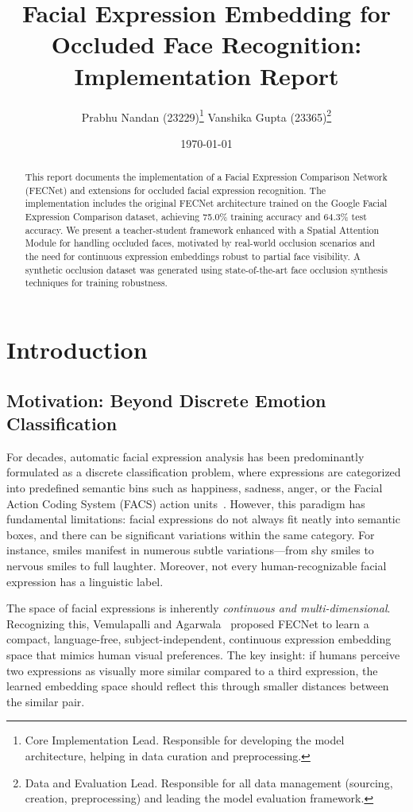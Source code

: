 \documentclass[10pt,twocolumn]{article}
\title{\textbf{Facial Expression Embedding for Occluded Face Recognition: \\ Implementation Report}}
\author{
    Prabhu Nandan (23229)\thanks{Core Implementation Lead. Responsible for developing the model architecture, helping in data curation and preprocessing.} \quad
    Vanshika Gupta (23365)\thanks{Data and Evaluation Lead. Responsible for all data management (sourcing, creation, preprocessing) and leading the model evaluation framework.}
}
\date{\today}
\begin{document}
\maketitle

\begin{abstract}
This report documents the implementation of a Facial Expression Comparison Network (FECNet) and extensions for occluded facial expression recognition. The implementation includes the original FECNet architecture trained on the Google Facial Expression Comparison dataset, achieving 75.0\% training accuracy and 64.3\% test accuracy. We present a teacher-student framework enhanced with a Spatial Attention Module for handling occluded faces, motivated by real-world occlusion scenarios and the need for continuous expression embeddings robust to partial face visibility. A synthetic occlusion dataset was generated using state-of-the-art face occlusion synthesis techniques for training robustness.
\end{abstract}

\section{Introduction}

\subsection{Motivation: Beyond Discrete Emotion Classification}
For decades, automatic facial expression analysis has been predominantly formulated as a discrete classification problem, where expressions are categorized into predefined semantic bins such as happiness, sadness, anger, or the Facial Action Coding System (FACS) action units~\cite{ekman1978facial}. However, this paradigm has fundamental limitations: facial expressions do not always fit neatly into semantic boxes, and there can be significant variations within the same category. For instance, smiles manifest in numerous subtle variations—from shy smiles to nervous smiles to full laughter. Moreover, not every human-recognizable facial expression has a linguistic label.

The space of facial expressions is inherently \textit{continuous and multi-dimensional}. Recognizing this, Vemulapalli and Agarwala~\cite{vemulapalli2019compact} proposed FECNet to learn a compact, language-free, subject-independent, continuous expression embedding space that mimics human visual preferences. The key insight: if humans perceive two expressions as visually more similar compared to a third expression, the learned embedding space should reflect this through smaller distances between the similar pair.
\end{document}
